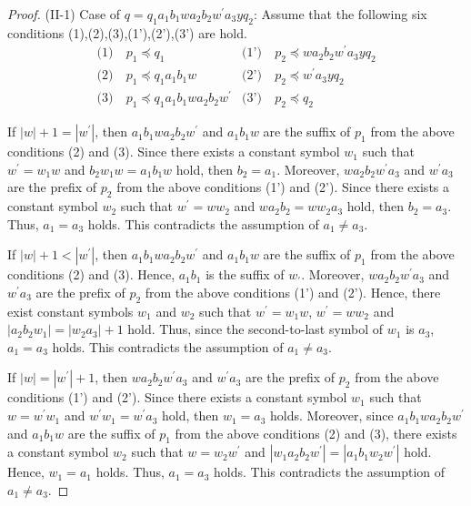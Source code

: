 \begin{proof}
\noindent
(II-1) Case of $q=q_{1}a_{1}b_{1}wa_{2}b_{2}w^{\prime}a_{3}yq_{2}$:
Assume that the following six conditions (1),(2),(3),(1'),(2'),(3') are hold.
\begin{align*}
\textrm{(1)}~& p_{1} \preceq q_{1} & \textrm{(1')}~& p_{2} \preceq wa_{2}b_{2}w^{\prime}a_{3}yq_{2} \\
\textrm{(2)}~& p_{1} \preceq q_{1}a_{1}b_{1}w & \textrm{(2')}~& p_{2} \preceq w^{\prime}a_{3}yq_{2} \\
\textrm{(3)}~& p_{1} \preceq q_{1}a_{1}b_{1}wa_{2}b_{2}w^{\prime} & \textrm{(3')}~& p_{2} \preceq q_{2}
\end{align*}

If $|w|+1=|w^{\prime}|$, then $a_{1}b_{1}wa_{2}b_{2}w^{\prime}$ and $a_{1}b_{1}w$ are the suffix of $p_{1}$ from the above conditions (2) and (3).
Since there exists a constant symbol $w_{1}$ such that $w^{\prime}=w_{1}w$ and $b_{2}w_{1}w=a_{1}b_{1}w$ hold,
then $b_{2}=a_{1}$.
Moreover, $wa_{2}b_{2}w^{\prime}a_{3}$ and $w^{\prime}a_{3}$ are the prefix of $p_{2}$ from the above conditions (1') and (2').
Since there exists a constant symbol $w_{2}$ such that $w^{\prime}=ww_{2}$ and $wa_{2}b_{2}=ww_{2}a_{3}$ hold,
then $b_{2}=a_{3}$.
Thus, $a_{1} = a_{3}$ holds.
This contradicts the assumption of $a_{1} \ne a_{3}$.

If $|w|+1 < |w^{\prime}|$, then $a_{1}b_{1}wa_{2}b_{2}w^{\prime}$ and $a_{1}b_{1}w$ are the suffix of $p_{1}$ from the above conditions (2) and (3).
Hence, $a_{1}b_{1}$ is the suffix of $w_{\prime}$.
Moreover, $wa_{2}b_{2}w^{\prime}a_{3}$ and $w^{\prime}a_{3}$ are the prefix of $p_{2}$ from the above conditions (1') and (2').
Hence, there exist constant symbols $w_{1}$ and $w_{2}$ such that $w^{\prime}=w_{1}w$, $w^{\prime}=ww_{2}$ and $|a_{2}b_{2}w_{1}|=|w_{2}a_{3}|+1$ hold.
Thus, since the second-to-last symbol of $w_{1}$ is $a_{3}$, $a_{1}=a_{3}$ holds.
This contradicts the assumption of $a_{1} \ne a_{3}$.

If $|w|=|w^{\prime}|+1$, then $wa_{2}b_{2}w^{\prime}a_{3}$ and $w^{\prime}a_{3}$ are the prefix of $p_{2}$ from the above conditions (1') and (2').
Since there exists a constant symbol $w_{1}$ such that $w=w^{\prime}w_{1}$ and $w^{\prime}w_{1}=w^{\prime}a_{3}$ hold, then $w_{1}=a_{3}$ holds.
Moreover, since $a_{1}b_{1}wa_{2}b_{2}w^{\prime}$ and $a_{1}b_{1}w$ are the suffix of $p_{1}$ from the above conditions (2) and (3), 
there exists a constant symbol $w_{2}$ such that $w=w_{2}w^{\prime}$ and $|w_{1}a_{2}b_{2}w^{\prime}|=|a_{1}b_{1}w_{2}w^{\prime}|$ hold.
Hence, $w_{1}=a_{1}$ holds.
Thus, $a_{1}=a_{3}$ holds.
This contradicts the assumption of $a_{1}\ne a_{3}$.


\end{proof}
